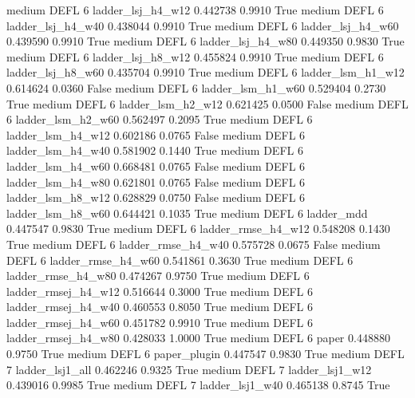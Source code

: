     medium     DEFL                 6   ladder_lsj_h4_w12   0.442738      0.9910    True
    medium     DEFL                 6   ladder_lsj_h4_w40   0.438044      0.9910    True
    medium     DEFL                 6   ladder_lsj_h4_w60   0.439590      0.9910    True
    medium     DEFL                 6   ladder_lsj_h4_w80   0.449350      0.9830    True
    medium     DEFL                 6   ladder_lsj_h8_w12   0.455824      0.9910    True
    medium     DEFL                 6   ladder_lsj_h8_w60   0.435704      0.9910    True
    medium     DEFL                 6   ladder_lsm_h1_w12   0.614624      0.0360   False
    medium     DEFL                 6   ladder_lsm_h1_w60   0.529404      0.2730    True
    medium     DEFL                 6   ladder_lsm_h2_w12   0.621425      0.0500   False
    medium     DEFL                 6   ladder_lsm_h2_w60   0.562497      0.2095    True
    medium     DEFL                 6   ladder_lsm_h4_w12   0.602186      0.0765   False
    medium     DEFL                 6   ladder_lsm_h4_w40   0.581902      0.1440    True
    medium     DEFL                 6   ladder_lsm_h4_w60   0.668481      0.0765   False
    medium     DEFL                 6   ladder_lsm_h4_w80   0.621801      0.0765   False
    medium     DEFL                 6   ladder_lsm_h8_w12   0.628829      0.0750   False
    medium     DEFL                 6   ladder_lsm_h8_w60   0.644421      0.1035    True
    medium     DEFL                 6          ladder_mdd   0.447547      0.9830    True
    medium     DEFL                 6  ladder_rmse_h4_w12   0.548208      0.1430    True
    medium     DEFL                 6  ladder_rmse_h4_w40   0.575728      0.0675   False
    medium     DEFL                 6  ladder_rmse_h4_w60   0.541861      0.3630    True
    medium     DEFL                 6  ladder_rmse_h4_w80   0.474267      0.9750    True
    medium     DEFL                 6 ladder_rmsej_h4_w12   0.516644      0.3000    True
    medium     DEFL                 6 ladder_rmsej_h4_w40   0.460553      0.8050    True
    medium     DEFL                 6 ladder_rmsej_h4_w60   0.451782      0.9910    True
    medium     DEFL                 6 ladder_rmsej_h4_w80   0.428033      1.0000    True
    medium     DEFL                 6               paper   0.448880      0.9750    True
    medium     DEFL                 6        paper_plugin   0.447547      0.9830    True
    medium     DEFL                 7     ladder_lsj1_all   0.462246      0.9325    True
    medium     DEFL                 7     ladder_lsj1_w12   0.439016      0.9985    True
    medium     DEFL                 7     ladder_lsj1_w40   0.465138      0.8745    True
